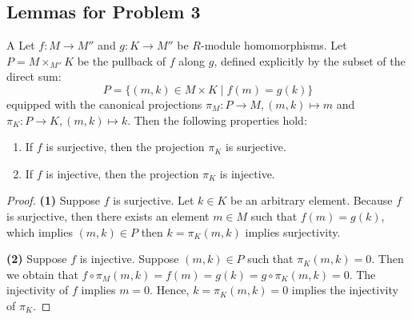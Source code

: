 \subsection*{Lemmas for Problem 3}

\begin{lemma}{A}
Let $f: M \to M''$ and $g: K \to M''$ be $R$-module homomorphisms. Let $P = M \times_{M''} K$ be the pullback of $f$ along $g$, defined explicitly by the subset of the direct sum:
\[ P = \{ (m, k) \in M \times K \mid f(m) = g(k) \} \]
equipped with the canonical projections $\pi_M: P \to M, (m, k) \mapsto m$ and $\pi_K: P \to K, (m, k) \mapsto k$. Then the following properties hold:
\begin{enumerate}
    \item If $f$ is surjective, then the projection $\pi_K$ is surjective.
    \item If $f$ is injective, then the projection $\pi_K$ is injective.
\end{enumerate}
\end{lemma}

\begin{proof}
\textbf{(1)} Suppose $f$ is surjective. Let $k \in K$ be an arbitrary element.
Because $f$ is surjective, then there exists an element $m\in M$ such that $f(m)=g(k)$, which implies $(m,k)\in P$ then $k=\pi_{K}(m,k)$ implies surjectivity.


\textbf{(2)} Suppose $f$ is injective. Suppose $(m,k)\in P$ such that $\pi_K(m,k)=0$. 
 Then we obtain that $f\circ \pi_M(m,k) = f(m) =g(k)= g\circ \pi_K(m,k) = 0$. The injectivity of $f$ implies $m=0$. Hence, $k=\pi_{K}(m,k)=0$ implies the injectivity of $\pi_K$.
\end{proof}

